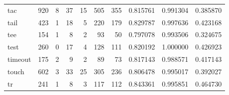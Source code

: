 \begin{tabular}{lrrrrrrrrr}
tac       &                    920 &                                  8 &                                37 &                               15 &                               505 &                             355 &                                0.815761 &                               0.991304 &                             0.385870 \\
tail      &                    423 &                                  1 &                                18 &                                5 &                               220 &                             179 &                                0.829787 &                               0.997636 &                             0.423168 \\
tee       &                    154 &                                  1 &                                 8 &                                2 &                                93 &                              50 &                                0.797078 &                               0.993506 &                             0.324675 \\
test      &                    260 &                                  0 &                                17 &                                4 &                               128 &                             111 &                                0.820192 &                               1.000000 &                             0.426923 \\
timeout   &                    175 &                                  2 &                                 9 &                                2 &                                89 &                              73 &                                0.817143 &                               0.988571 &                             0.417143 \\
touch     &                    602 &                                  3 &                                33 &                               25 &                               305 &                             236 &                                0.806478 &                               0.995017 &                             0.392027 \\
tr        &                    241 &                                  1 &                                 8 &                                3 &                               117 &                             112 &                                0.843361 &                               0.995851 &                             0.464730 \\

\end{tabular}
